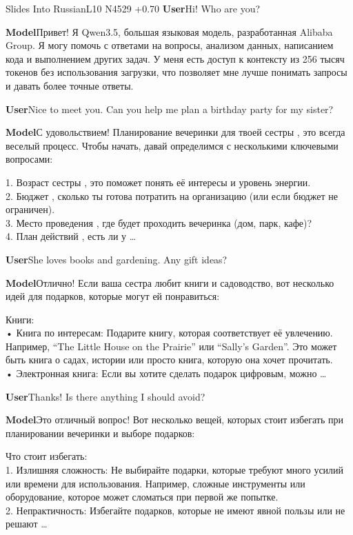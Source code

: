 \begin{chatbox}[breakable]{Slides Into Russian}{L10 N4529 +0.70}
\textbf{User}\quad Hi! Who are you?\par\smallskip
\textbf{Model}\quad Привет! Я Qwen3.5, большая языковая модель, разработанная Alibaba Group. Я могу помочь с ответами на вопросы, анализом данных, написанием кода и выполнением других задач. У меня есть доступ к контексту из 256 тысяч токенов без использования загрузки, что позволяет мне лучше понимать запросы и давать более точные ответы.\par\smallskip
\textbf{User}\quad Nice to meet you. Can you help me plan a birthday party for my sister?\par\smallskip
\textbf{Model}\quad С удовольствием! Планирование вечеринки для твоей сестры ,  это всегда веселый процесс. Чтобы начать, давай определимся с несколькими ключевыми вопросами:\par 1. Возраст сестры ,  это поможет понять её интересы и уровень энергии.\\ 2. Бюджет ,  сколько ты готова потратить на организацию (или если бюджет не ограничен).\\ 3. Место проведения ,  где будет проходить вечеринка (дом, парк, кафе)?\\ 4. План действий ,  есть ли у …\par\smallskip
\textbf{User}\quad She loves books and gardening. Any gift ideas?\par\smallskip
\textbf{Model}\quad Отлично! Если ваша сестра любит книги и садоводство, вот несколько идей для подарков, которые могут ей понравиться:\par Книги:\\ • Книга по интересам: Подарите книгу, которая соответствует её увлечению. Например, “The Little House on the Prairie” или “Sally's Garden”. Это может быть книга о садах, истории или просто книга, которую она хочет прочитать.\\ • Электронная книга: Если вы хотите сделать подарок цифровым, можно …\par\smallskip
\textbf{User}\quad Thanks! Is there anything I should avoid?\par\smallskip
\textbf{Model}\quad Это отличный вопрос! Вот несколько вещей, которых стоит избегать при планировании вечеринки и выборе подарков:\par Что стоит избегать:\\ 1. Излишняя сложность: Не выбирайте подарки, которые требуют много усилий или времени для использования. Например, сложные инструменты или оборудование, которое может сломаться при первой же попытке.\\ 2. Непрактичность: Избегайте подарков, которые не имеют явной пользы или не решают …\par\smallskip
\end{chatbox}
